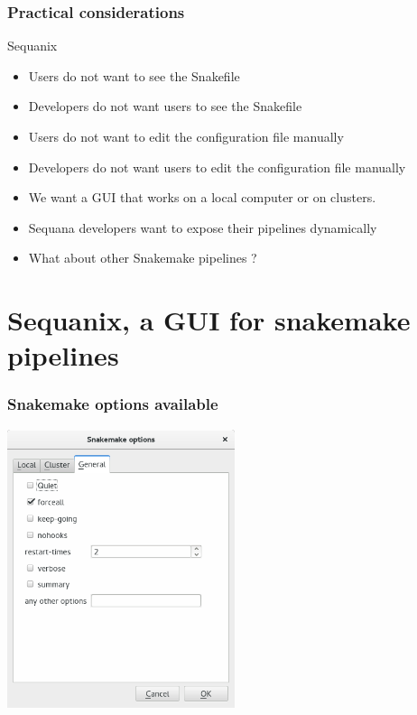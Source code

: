 \documentclass{beamer}
\begin{document}
\begin{frame}
\frametitle{Practical considerations}

\begin{block}{Sequanix}
\begin{itemize}
 \item Users do not want to see the Snakefile
 \item Developers do not want users to see the Snakefile
 \pause
 \item Users do not want to edit the configuration file manually
 \item Developers do not want users to edit the configuration file manually
 \pause
 \item We want a GUI that works on a local computer or on clusters.
 \pause
 \item Sequana developers want to expose their pipelines dynamically
 \pause
 \item What about other Snakemake pipelines ? 
\end{itemize}
\end{block}
\end{frame}


\section{Sequanix, a GUI for snakemake pipelines}



\begin{frame}
  \frametitle{Snakemake options available}
  \centering
   \includegraphics[height=0.8\textheight,width=0.5\textwidth]
   {./images/snakemake_general.png}
\end{frame}
\end{document}

